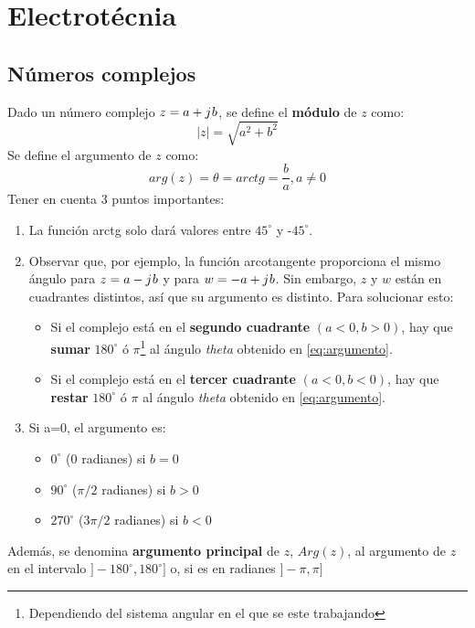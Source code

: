 \documentclass[
	12pt, %
	fleqn, %
	a4paper, %
	oneside, %
]{LegrandOrangeBook}
\begin{document}
\part{Electrotécnia}
\chapter{Números complejos}
\begin{definition}
Dado un número complejo $z=a+{j\mkern1mu} b$, se define el \textbf{módulo} de $z$ como:
\begin{equation}
|z|=\sqrt{a^2+b^2}
\end{equation}
Se define el argumento de $z$ como:
\begin{equation}
arg(z)=\theta=arctg=\frac{b}{a}, a\neq 0
\label{eq:argumento}
\end{equation}
Tener en cuenta 3 puntos importantes:
\begin{enumerate}
\item La función arctg solo dará valores entre $45^{\circ}$ y -$45^{\circ}$.
\item Observar que, por ejemplo, la función arcotangente proporciona el mismo ángulo para $z=a-{j\mkern1mu} b$ y para $w=-a+{j\mkern1mu} b$. Sin embargo, $z$ y $w$ están en cuadrantes distintos, así que su argumento es distinto. Para solucionar esto:
\begin{itemize}
\item Si el complejo está en el \textbf{segundo cuadrante} $(a<0, b>0)$, hay que \textbf{sumar} $180^{\circ}$ ó $\pi$\footnote{Dependiendo del sistema angular en el que se este trabajando} al ángulo \textit{theta} obtenido en \ref{eq:argumento}.
\item Si el complejo está en el \textbf{tercer cuadrante} $(a<0, b<0)$, hay que \textbf{restar} $180^{\circ}$ ó $\pi$ al ángulo \textit{theta} obtenido en \ref{eq:argumento}.
\end{itemize}
\item Si a=0, el argumento es:
\begin{itemize}
\item $0^{\circ}$ (0 radianes) si $b=0$
\item $90^{\circ}$ ($\pi/2$ radianes) si $b>0$
\item $270^{\circ}$ ($3\pi/2$ radianes) si $b<0$
\end{itemize}
\end{enumerate}
Además, se denomina \textbf{argumento principal} de $z$, $Arg(z)$, al argumento de $z$ en el intervalo $]-180^{\circ},180^{\circ}]$ o, si es en radianes $]-\pi,\pi]$
\end{definition}
\end{document}
